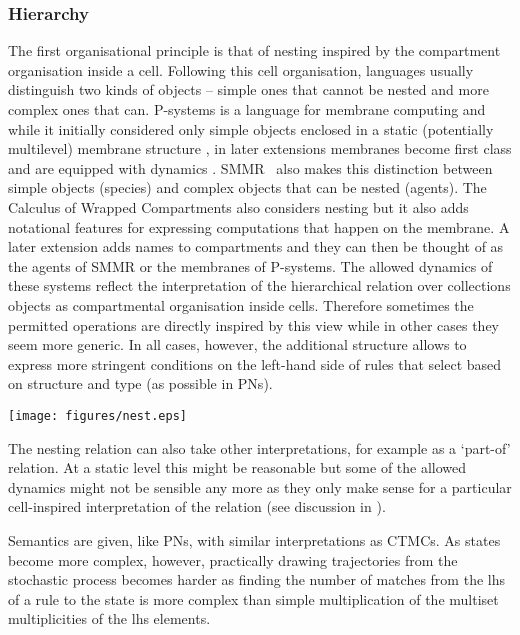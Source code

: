 \subsubsection*{Hierarchy}
The first organisational principle is that of nesting inspired by the
compartment organisation inside a cell. Following this cell organisation,
languages usually distinguish two kinds of objects -- simple ones that cannot be
nested and more complex ones that can. P-systems is a language for membrane
computing and while it initially considered only simple objects enclosed in a
static (potentially multilevel) membrane structure \citep{puaun2000computing},
in later extensions membranes become first class and are equipped with dynamics
\citep{puaun2001p}. SMMR~\citep{oury_multi-level_2013} also makes this
distinction between simple objects (species) and complex objects that can be
nested (agents). The Calculus of Wrapped Compartments \citep{coppo_stochastic}
also considers nesting but it also adds notational features for expressing
computations that happen on the membrane. A later extension
\citep{coppo_hybrid_2010} adds names to compartments and they can then be
thought of as the agents of SMMR or the membranes of P-systems. The allowed
dynamics of these systems reflect the interpretation of the hierarchical
relation over collections objects as compartmental organisation inside
cells. Therefore sometimes the permitted operations are directly inspired by
this view while in other cases they seem more generic. In all cases, however,
the additional structure allows to express more stringent conditions on the
left-hand side of rules that select based on structure and type (as possible in
PNs).
\begin{center}
    \texttt{[image: figures/nest.eps]}
  \end{center}  
The nesting relation can also take other interpretations, for example as a
`part-of' relation. At a static level this might be reasonable but some of the
allowed dynamics might not be sensible any more as they only make sense for a
particular cell-inspired interpretation of the relation (see discussion in
\citet{artale_part-whole_1996}).

Semantics are given, like PNs, with similar interpretations as
CTMCs. As states become more complex, however, practically drawing trajectories
from the stochastic process becomes harder as finding the number of matches from
the lhs of a rule to the state is more complex than simple multiplication of the
multiset multiplicities of the lhs elements.

